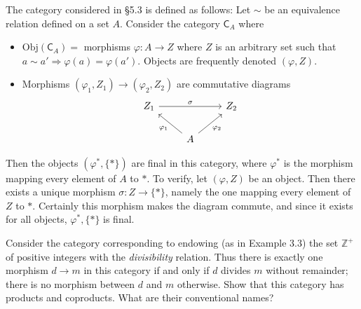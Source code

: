\documentclass[../../master.tex]{subfiles}
\begin{document}
    \begin{solution}
      The category considered in \S 5.3 is defined as follows:
      Let \(\sim\) be an equivalence relation defined on a set \(A\).
      Consider the category \(\mathsf{C}_{A}\) where
      \begin{itemize}
        \item \(\text{Obj}(\mathsf{C}_{A}) =\) morphisms \(\varphi: A \to Z\) where \(Z\) is an arbitrary set such that \(a \sim a' \Longrightarrow \varphi(a) = \varphi(a')\).
        Objects are frequently denoted \((\varphi, Z)\).
        \item Morphisms \((\varphi_{1}, Z_{1}) \to (\varphi_{2}, Z_{2})\) are commutative diagrams
        \[
        \begin{tikzcd}
          {Z_{1}} && {Z_{2}} \\
          & {A}
          \arrow["{\varphi_{1}}", from=2-2, to=1-1]
          \arrow["{\varphi_{2}}"', from=2-2, to=1-3]
          \arrow["{\sigma}", from=1-1, to=1-3]
        \end{tikzcd}
        \]
      \end{itemize}
      Then the objects \((\varphi^{*}, \{*\})\) are final in this category, where \(\varphi^{*}\) is the morphism mapping every element of \(A\) to \(*\).
      To verify, let \((\varphi, Z)\) be an object.
      Then there exists a unique morphism \(\sigma: Z \to \{*\}\), namely the one mapping every element of \(Z\) to \(*\).
      Certainly this morphism makes the diagram commute, and since it exists for all objects, \(\varphi^{*}, \{*\}\) is final.
    \end{solution}

    \begin{problem}
      Consider the category corresponding to endowing (as in Example 3.3) the set \(\mathbb{Z}^{+}\) of positive integers with the \textit{divisibility} relation.
      Thus there is exactly one morphism \(d \to m\) in this category if and only if \(d\) divides \(m\) without remainder;
      there is no morphism between \(d\) and \(m\) otherwise.
      Show that this category has products and coproducts.
      What are their conventional names?
    \end{problem}
\end{document}
